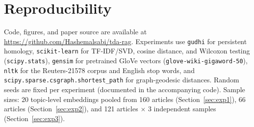 \documentclass[11pt]{article}
\begin{document}
\section{Reproducibility}

Code, figures, and paper source are available at \url{https://github.com/Hashemalsabi/tda-rag}. Experiments use \texttt{gudhi} for persistent homology, \texttt{scikit-learn} for TF-IDF/SVD, cosine distance, and Wilcoxon testing (\texttt{scipy.stats}), \texttt{gensim} for pretrained GloVe vectors (\texttt{glove-wiki-gigaword-50}), \texttt{nltk} for the Reuters-21578 corpus and English stop words, and \texttt{scipy.sparse.\allowbreak csgraph.\allowbreak shortest\_path} for graph-geodesic distances. Random seeds are fixed per experiment (documented in the accompanying code). Sample sizes: 20 topic-level embeddings pooled from 160 articles (Section~\ref{sec:exp1}), 66 articles (Section~\ref{sec:exp2}), and 121 articles $\times$ 3 independent samples (Section~\ref{sec:exp3}).
\end{document}
